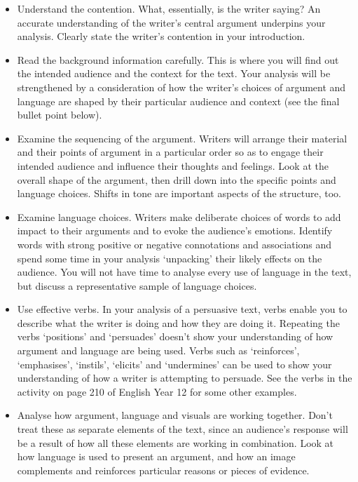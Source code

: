 \documentclass[a4paper]{article}
\begin{document}
\begin{itemize}
    \item Understand the contention. What, essentially, is the writer saying? An accurate understanding of the writer’s central argument underpins your analysis. Clearly state the writer’s contention in your introduction.

\item Read the background information carefully. This is where you will find out the intended audience and the context for the text. Your analysis will be strengthened by a consideration of how the writer’s choices of argument and language are shaped by their particular audience and context (see the final bullet point below).

\item Examine the sequencing of the argument. Writers will arrange their material and their points of argument in a particular order so as to engage their intended audience and influence their thoughts and feelings. Look at the overall shape of the argument, then drill down into the specific points and language choices. Shifts in tone are important aspects of the structure, too.

\item Examine language choices. Writers make deliberate choices of words to add impact to their arguments and to evoke the audience’s emotions. Identify words with strong positive or negative connotations and associations and spend some time in your analysis ‘unpacking’ their likely effects on the audience. You will not have time to analyse every use of language in the text, but discuss a representative sample of language choices.

\item Use effective verbs. In your analysis of a persuasive text, verbs enable you to describe what the writer is doing and how they are doing it. Repeating the verbs ‘positions’ and ‘persuades’ doesn’t show your understanding of how argument and language are being used. Verbs such as ‘reinforces’, ‘emphasises’, ‘instils’, ‘elicits’ and ‘undermines’ can be used to show your understanding of how a writer is attempting to persuade. See the verbs in the activity on page 210 of English Year 12 for some other examples.

\item Analyse how argument, language and visuals are working together. Don’t treat these as separate elements of the text, since an audience’s response will be a result of how all these elements are working in combination. Look at how language is used to present an argument, and how an image complements and reinforces particular reasons or pieces of evidence.
\end{itemize}
\end{document}
